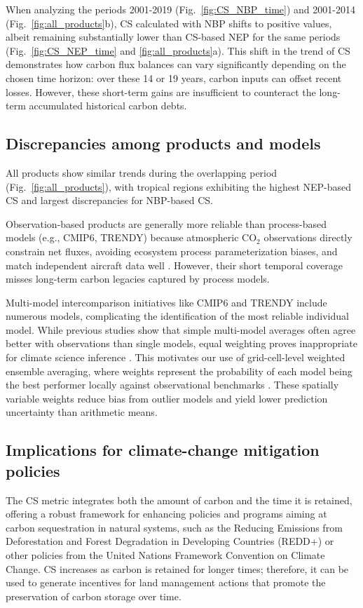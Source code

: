 \documentclass[ProofPDF]{./Styles/Jnls-Template-V3}
\begin{document}
When analyzing the periods 2001-2019 (Fig.~\ref{fig:CS_NBP_time}) and 2001-2014 (Fig.~\ref{fig:all_products}b), CS calculated with NBP shifts to positive values, albeit remaining substantially lower than CS-based NEP for the same periods (Fig.~\ref{fig:CS_NEP_time} and \ref{fig:all_products}a). This shift in the trend of CS demonstrates how carbon flux balances can vary significantly depending on the chosen time horizon: over these 14 or 19 years, carbon inputs can offset recent losses. However, these short-term gains are insufficient to counteract the long-term accumulated historical carbon debts. 

\subsection{Discrepancies among products and models}
All products show similar trends during the overlapping period (Fig.~\ref{fig:all_products}), with tropical regions exhibiting the highest NEP-based CS and largest discrepancies for NBP-based CS.

Observation-based products are generally more reliable than process-based models (e.g., CMIP6, TRENDY) because atmospheric CO$_2$ observations directly constrain net fluxes, avoiding ecosystem process parameterization biases, and match independent aircraft data well \citep{Gaubert2019,Woude2025}. However, their short temporal coverage misses long-term carbon legacies captured by process models.

Multi-model intercomparison initiatives like CMIP6 and TRENDY include numerous models, complicating the identification of the most reliable individual model. While previous studies show that simple multi-model averages often agree better with observations than single models, equal weighting proves inappropriate for climate science inference \citep{Hagedorn2005,Knutti2017}. This motivates our use of grid-cell-level weighted ensemble averaging, where weights represent the probability of each model being the best performer locally against observational benchmarks \citep{Sierra2025GDM}. These spatially variable weights reduce bias from outlier models and yield lower prediction uncertainty than arithmetic means.


\subsection{Implications for climate-change mitigation policies}

The CS metric integrates both the amount of carbon and the time it is retained, offering a robust framework for enhancing policies and programs aiming at carbon sequestration in natural systems, such as the Reducing Emissions from Deforestation and Forest Degradation in Developing Countries (REDD+) or other policies from the United Nations Framework Convention on Climate Change. CS increases as carbon is retained for longer times; therefore, it can be used to generate incentives for land management actions that promote the preservation of carbon storage over time. 
\end{document}
